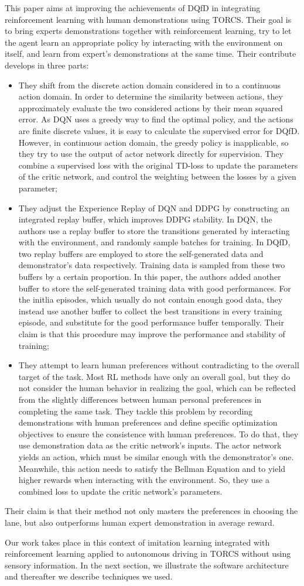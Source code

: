 This paper \cite{cinesi} aims at improving the achievements of DQfD \cite{dqlfd} in integrating reinforcement learning with human demonstrations using TORCS.
Their goal is to bring experts demonstrations together with reinforcement learning, try to let the agent learn an appropriate policy by interacting with the environment on itself, and learn from expert’s demonstrations at the same time.
Their contribute develops in three parts:
\begin{itemize}
\item They shift from the discrete action domain considered in \cite{dqlfd} to a continuous action domain.
In order to determine the similarity between actions, they approximately evaluate the two considered actions by their mean squared error.  As DQN uses a greedy way to find the optimal policy, and the actions are finite discrete values, it is easy to calculate the supervised error for DQfD. However, in continuous action domain, the greedy policy is inapplicable, so they try to use the output of actor network directly for supervision. They combine a supervised loss with the original TD-loss to update the parameters of the critic network, and control the weighting between the losses by a given parameter;
\item They adjust the Experience Replay of DQN and DDPG by constructing an integrated replay buffer, which improves DDPG stability.  In DQN, the authors use a replay buffer to store the transitions generated by interacting with the environment, and randomly sample batches for training. In DQfD, two replay buffers are employed to store the self-generated data and demonstrator’s data respectively. Training data is sampled from these two buffers by a certain proportion. In this paper, the authors added another buffer to store the self-generated training data with good performances. 
For the initlia episodes, which usually do not contain enough good data, they instead use another buffer to collect the best transitions in every training episode, and substitute for the good performance buffer temporally. 
Their claim is that this procedure may improve the performance and stability of training;
\item  They attempt to learn human preferences without contradicting to the overall target of the task. Most RL methods have only an overall goal, but they do not consider the human behavior in realizing the goal, which can be reflected from the slightly differences between human personal preferences in completing the same task. They tackle this problem by recording demonstrations with human preferences and define specific optimization objectives to ensure the consistence with human preferences. To do that, they use demonstration data as the critic network’s inputs. The actor network yields an action, which must be similar enough with the demonstrator’s one. Meanwhile, this action needs to satisfy the Bellman Equation and to yield higher rewards when interacting with the environment. So, they use a combined loss to update the critic network’s parameters.
\end{itemize}
Their claim is that their method not only masters the preferences in choosing the lane, but also outperforms human expert demonstration in average reward.



Our work takes place in this context of imitation learning integrated with reinforcement learning applied to autonomous driving in TORCS without using sensory information. In the next section, we illustrate the software architecture and thereafter we describe techniques we used. 
